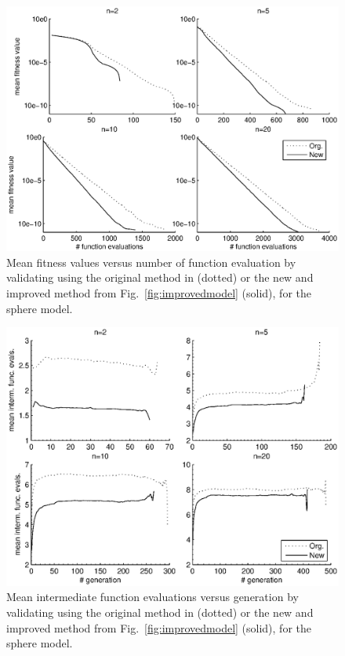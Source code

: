 \documentclass[conference]{IEEEtran}
\begin{document}
\begin{figure}[b!]
\centering
\includegraphics[trim = 10mm 10mm 10mm 5mm, clip, width=0.99\columnwidth]{figs/sphere_meanFitness_funcEval.eps}
\caption{Mean fitness values versus number of function evaluation by validating using the original method in \cite{Ru06:PPSN} (dotted) or the new and improved method from Fig.~\ref{fig:improvedmodel} (solid), for the sphere model.}
\label{fig:sphereFitness}
\end{figure}
\begin{figure}[t!]
\centering
\includegraphics[trim = 10mm 10mm 10mm 5mm, clip, width=0.99\columnwidth]{figs/sphere_intmEvals_gen.eps}
\caption{Mean intermediate function evaluations versus generation by validating using the original method in \cite{Ru06:PPSN} (dotted) or the new and improved method from Fig.~\ref{fig:improvedmodel} (solid), for the sphere model.}
\label{fig:sphereIntmEval}
\end{figure}
\end{document}
